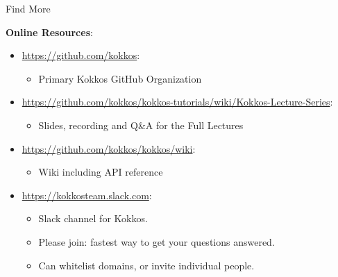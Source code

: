 \begin{frame}{Find More}

\textbf{Online Resources}:

\begin{itemize}
        \item \url{https://github.com/kokkos}:
                \begin{itemize}
                        \item Primary Kokkos GitHub Organization
                \end{itemize}
        \item \url{https://github.com/kokkos/kokkos-tutorials/wiki/Kokkos-Lecture-Series}:
                \begin{itemize}
			\item{Slides, recording and Q\&A for the Full Lectures}
                \end{itemize}
        \item \url{https://github.com/kokkos/kokkos/wiki}:
                \begin{itemize}
                        \item Wiki including API reference
                \end{itemize}
        \item \url{https://kokkosteam.slack.com}:
                \begin{itemize}
                        \item Slack channel for Kokkos.
                        \item Please join: fastest way to get your questions answered.
                        \item Can whitelist domains, or invite individual people.
                \end{itemize}
\end{itemize}

\end{frame}












